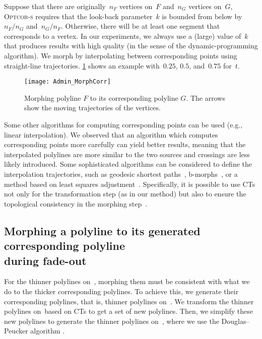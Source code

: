 Suppose that there are originally~$n_F$ vertices on~$F$ 
and~$n_G$ vertices on~$G$,
\textsc{Optcor-s} requires that 
the look-back parameter~$k$ is bounded from below 
by~$n_F/n_G$ and~$n_G/n_F$. 
Otherwise, there will be at least one segment 
that corresponds to a vertex. 
In our experiments, we always use a (large) value of~$k$ 
that produces results with high quality 
(in the sense of the dynamic-programming algorithm). 
We morph by interpolating between corresponding points using
straight-line trajectories. 
\fig\ref{fig:Admin_MorphCorr} shows an example
with~$0.25$, $0.5$, and~$0.75$ for~$t$.

\begin{figure}[tb]
\centering
\texttt{[image: Admin\_MorphCorr]}
\caption{Morphing polyline $F$ to its corresponding 
    polyline $G$. 
    The arrows show the moving trajectories of the vertices.}
\label{fig:Admin_MorphCorr}
\end{figure}

Some other algorithms for computing corresponding points 
can be used (e.g., linear interpolation). 
We observed that an algorithm which
computes corresponding points more carefully 
can yield better results, 
meaning that the interpolated polylines 
are more similar to the two sources and
crossings are less likely introduced.
Some sophisticated algorithms can be 
considered to define the interpolation trajectories, 
such as geodesic shortest paths~\parencite{Bereg2005}, 
b-morphs~\parencite{Whited2011BallMorph}, 
or a method based on 
least squares adjustment~\parencite{Peng2013LSA}. 
Specifically, it is possible to use CTs
not only for the transformation step (as in our method) 
but also to ensure the topological consistency 
in the morphing step~\parencite[see][]
{GotsmanS2001,Surazhsky2003Intrinsic,Surazhsky2004HighQuality}.

\subsection[Morphing a polyline to 
its generated corresponding polyline] 
{Morphing a polyline to 
its generated corresponding polyline \\ during fade-out}
\label{sec:Admin_MorphSinglePolylines}

For the thinner polylines on~\ml, 
morphing them must be consistent with 
what we do to the thicker corresponding polylines. 
To achieve this, we generate their corresponding polylines, 
that is, thinner polylines on~\ms. 
We transform the thinner polylines on~\ml based on CTs
to get a set of new polylines.
Then, we simplify these new polylines 
to generate the thinner polylines on~\ms,
where we use the Douglas--Peucker algorithm
\parencite{Douglas1973}.

